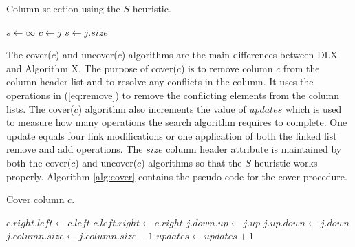 \begin{algorithm}[htbp]
	\caption{Column selection using the $S$ heuristic.}
	\label{alg:column}
	\begin{distribalgo}[1]
			\STATE $s \leftarrow \infty$
					\STATE $c \leftarrow j$
					\STATE $s \leftarrow j.size$
				\ENDIF
			\ENDFOR
		\ENDFUNC
	\end{distribalgo}
\end{algorithm}

The cover($c$) and uncover($c$) algorithms are the main differences between DLX and Algorithm X.
The purpose of cover($c$) is to remove column $c$ from the column header list and to resolve any conflicts in the column.
It uses the operations in (\ref{eq:remove}) to remove the conflicting elements from the column lists.
The cover($c$) algorithm also increments the value of $updates$ which is used to measure how many operations the search algorithm requires to complete.
One update equals four link modifications or one application of both the linked list remove and add operations.
The $size$ column header attribute is maintained by both the cover($c$) and uncover($c$) algorithms so that the $S$ heuristic works properly.
Algorithm \ref{alg:cover} contains the pseudo code for the cover procedure.
\begin{algorithm}[htbp]
	\caption{Cover column $c$.}
	\label{alg:cover}
	\begin{distribalgo}[1]
			\STATE $c.right.left \leftarrow c.left$  
			\STATE $c.left.right \leftarrow c.right$
					\STATE $j.down.up \leftarrow j.up$  
					\STATE $j.up.down \leftarrow j.down$
					\STATE $j.column.size \leftarrow j.column.size - 1$
					\STATE $updates \leftarrow updates + 1$
				\ENDFOR
			\ENDFOR
		\ENDPROC
	\end{distribalgo}
\end{algorithm}

